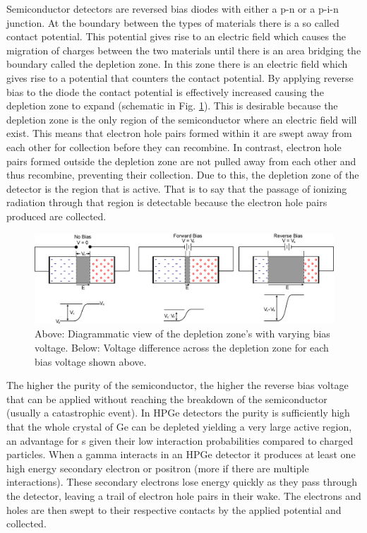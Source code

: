 Semiconductor detectors are reversed bias diodes with either a p-n or a p-i-n junction. At the boundary between the types of materials there is a so called contact potential. This potential gives rise to an electric field which causes the migration of charges between the two materials until there is an area bridging the boundary called the depletion zone. In this zone there is an electric field which gives rise to a potential that counters the contact potential. By applying reverse bias to the diode the contact potential is effectively increased causing the depletion zone to expand (schematic in Fig. \ref{fig:chp3-pn_diode}). This is desirable because the depletion zone is the only region of the semiconductor where an electric field will exist. This means that electron hole pairs formed within it are swept away from each other for collection before they can recombine. In contrast, electron hole pairs formed outside the depletion zone are not pulled away from each other and thus recombine, preventing their collection. Due to this, the depletion zone of the detector is the region that is active. That is to say that the passage of ionizing radiation through that region is detectable because the electron hole pairs produced are collected.

\begin{figure}[h!]
	\centerline{\includegraphics[width=\textwidth]{./img/c3/pn-diode.eps}}
	\caption{Above: Diagrammatic view of the depletion zone's with varying bias voltage. Below: Voltage difference across the depletion zone for each bias voltage shown above.}
	\label{fig:chp3-pn_diode}
\end{figure}

The higher the purity of the semiconductor, the higher the reverse bias voltage that can be applied without reaching the breakdown of the semiconductor (usually a catastrophic event). In HPGe detectors the purity is sufficiently high that the whole crystal of Ge can be depleted yielding a very large active region, an advantage for \gr{}s given their low interaction probabilities compared to charged particles. When a gamma interacts in an HPGe detector it produces at least one high energy secondary electron or positron (more if there are multiple interactions). These secondary electrons lose energy quickly as they pass through the detector, leaving a trail of electron hole pairs in their wake. The electrons and holes are then swept to their respective contacts by the applied potential and collected.

